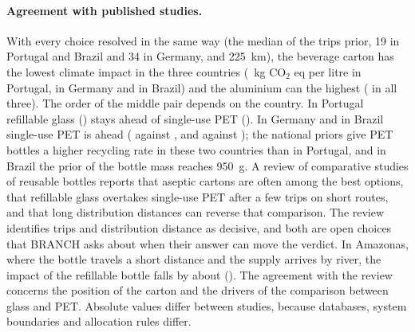 \documentclass{article}
\begin{document}
\paragraph{Agreement with published studies.}
With every choice resolved in the same way (the median of the trips prior, 19 in Portugal and Brazil and 34
in Germany, and 225~km), the beverage carton has the lowest climate impact in the three countries
(\impCartonPT{}~kg CO$_2$ eq per litre in Portugal, \impCartonDE{} in Germany and \impCartonBR{} in Brazil)
and the aluminium can the highest (\impCanPT{} in all three). The order of the middle pair
depends on the country. In Portugal refillable glass (\impGlassPT{}) stays ahead of single-use PET
(\impPETPT{}). In Germany and in Brazil single-use PET is ahead (\impPETDE{} against \impGlassDE{}, and \impPETBR{}
against \impGlassBR{}); the national priors give PET bottles a higher recycling
rate in these two countries than in Portugal, and in Brazil the prior of the bottle mass reaches 950~g. A review of comparative
studies of reusable bottles \citep{furberg2021} reports that aseptic cartons are often among
the best options, that refillable glass overtakes single-use PET after a few trips on short routes, and that long
distribution distances can reverse that comparison. The review identifies trips and distribution distance
as decisive, and both are open choices that BRANCH asks about when their answer can move the verdict. In Amazonas, where the bottle travels a short distance and
the supply arrives by river, the impact of the refillable bottle falls by about \dropAM{} (\impGlassAM{}). The agreement with the review concerns the
position of the carton and the drivers of the comparison between glass and PET. Absolute values differ between studies, because databases, system boundaries and
allocation rules differ.
\end{document}
